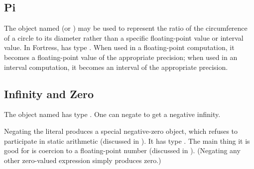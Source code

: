 \subsection{Pi}

The object named \EXP{\pi} (or ) may be used to represent the ratio
of the circumference of a circle to its diameter rather than a specific
floating-point value or interval value.
In Fortress, \EXP{\pi} has type
.
When used in a floating-point computation, it becomes
a floating-point value of the appropriate precision; when used in an interval
computation, it becomes an interval of the appropriate precision.

\subsection{Infinity and Zero}

The object named \EXP{\infty} has type .
One can negate \EXP{\infty} to get a negative infinity.

Negating the literal  produces a special negative-zero object,
which refuses to participate in static arithmetic
(discussed in ).  It
has type .  The main thing it is good for is coercion to
a floating-point number (discussed in
).
(Negating any other zero-valued expression simply produces zero.)
